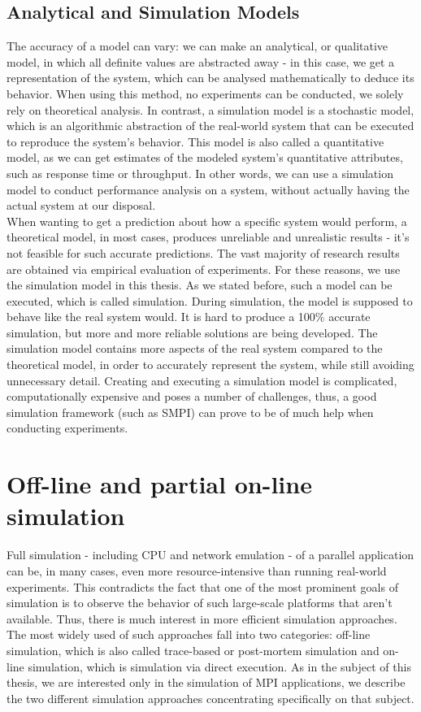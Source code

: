 \subsection{Analytical and Simulation Models}
The accuracy of a model can vary: we can make an analytical, or
qualitative model, in which all definite values are abstracted away -
in this case, we get a representation of
the system, which can be analysed mathematically to deduce its
behavior. When using this method, no experiments can be conducted, we
solely rely on theoretical analysis. In contrast, a simulation model
is a stochastic model, which is an algorithmic abstraction of the
real-world system that can be executed to reproduce the system's
behavior. This model is also called a quantitative model, as we can
get estimates of the modeled system's quantitative attributes, such as
response time or throughput. In other words, we can use a simulation
model to conduct performance analysis on a system, without actually
having the actual system at our disposal.\cite{h12_1}\cite{h12_13}\\
When wanting to get a prediction about how a specific system would
perform, a theoretical model, in most cases, produces unreliable and
unrealistic results - it's not feasible for such accurate
predictions. The vast majority of research results are obtained via
empirical evaluation of experiments.\cite{clq08} For these reasons, we
use the simulation model in this thesis. As we stated before, such a
model can be executed, which is called simulation. During simulation,
the model is supposed to behave like the real system would. It is hard
to produce a 100\% accurate simulation, but more and more reliable
solutions are being developed. The simulation model contains
more aspects of the real system compared to the theoretical model, in
order to accurately represent the system, while still avoiding
unnecessary detail.\cite{h12_1} Creating and executing a simulation
model is complicated, computationally expensive and poses a number of
challenges, thus, a good simulation framework (such as SMPI) can prove
to be of much help when conducting experiments.
\section{Off-line and partial on-line simulation}
Full simulation - including CPU and network emulation - of a parallel
application can be, in many cases, even more resource-intensive than
running real-world experiments. This contradicts the fact that one of
the most prominent goals of simulation is to observe the behavior of
such large-scale platforms that aren't available. Thus, there is much
interest in more efficient simulation approaches. \cite{bdglmqssv13}
The most widely used of such approaches fall into two categories:
off-line simulation, which is also called trace-based or post-mortem
simulation and on-line simulation, which is simulation via direct
execution.\cite{csgscq11} As in the subject of this thesis, we are
interested only in the simulation of MPI applications, we describe
the two different simulation approaches concentrating specifically on
that subject.
